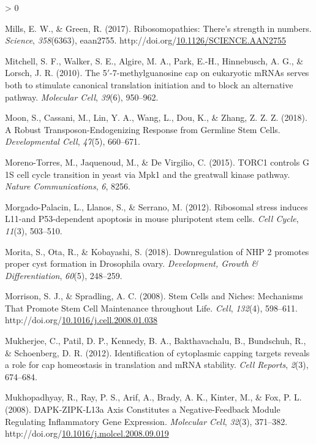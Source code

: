 \documentclass[12pt,oneside]{reedthesis}
\newlength{\cslhangindent}
\newenvironment{CSLReferences}[2] %
 {%
  \setlength{\parindent}{0pt}
  \ifodd #1 \everypar{\setlength{\hangindent}{\cslhangindent}}\ignorespaces\fi
  \ifnum #2 > 0
  \setlength{\parskip}{#2\baselineskip}
  \fi
 }%
 {}
\begin{document}
\begin{CSLReferences}{1}{0}
\leavevmode\hypertarget{ref-Mills2017c}{}%
Mills, E. W., \& Green, R. (2017). Ribosomopathies: {There}'s strength in numbers. \emph{Science}, \emph{358}(6363), eaan2755. http://doi.org/\href{https://doi.org/10.1126/SCIENCE.AAN2755}{10.1126/SCIENCE.AAN2755}

\leavevmode\hypertarget{ref-Mitchell2010}{}%
Mitchell, S. F., Walker, S. E., Algire, M. A., Park, E.-H., Hinnebusch, A. G., \& Lorsch, J. R. (2010). The 5{\({'}\)}-7-methylguanosine cap on eukaryotic {mRNAs} serves both to stimulate canonical translation initiation and to block an alternative pathway. \emph{Molecular Cell}, \emph{39}(6), 950--962.

\leavevmode\hypertarget{ref-Moon2018a}{}%
Moon, S., Cassani, M., Lin, Y. A., Wang, L., Dou, K., \& Zhang, Z. Z. Z. (2018). A {Robust Transposon-Endogenizing Response} from {Germline Stem Cells}. \emph{Developmental Cell}, \emph{47}(5), 660--671.

\leavevmode\hypertarget{ref-Moreno-Torres2015}{}%
Moreno-Torres, M., Jaquenoud, M., \& De Virgilio, C. (2015). {TORC1} controls {G} 1{{S}} cell cycle transition in yeast via {Mpk1} and the greatwall kinase pathway. \emph{Nature Communications}, \emph{6}, 8256.

\leavevmode\hypertarget{ref-Morgado-Palacin2012a}{}%
Morgado-Palacin, L., Llanos, S., \& Serrano, M. (2012). Ribosomal stress induces {L11-and} P53-dependent apoptosis in mouse pluripotent stem cells. \emph{Cell Cycle}, \emph{11}(3), 503--510.

\leavevmode\hypertarget{ref-Morita2018}{}%
Morita, S., Ota, R., \& Kobayashi, S. (2018). Downregulation of {NHP} 2 promotes proper cyst formation in {Drosophila} ovary. \emph{Development, Growth \& Differentiation}, \emph{60}(5), 248--259.

\leavevmode\hypertarget{ref-morrisonStemCellsNiches2008}{}%
Morrison, S. J., \& Spradling, A. C. (2008). Stem {Cells} and {Niches}: {Mechanisms That Promote Stem Cell Maintenance} throughout {Life}. \emph{Cell}, \emph{132}(4), 598--611. http://doi.org/\href{https://doi.org/10.1016/j.cell.2008.01.038}{10.1016/j.cell.2008.01.038}

\leavevmode\hypertarget{ref-Mukherjee2012}{}%
Mukherjee, C., Patil, D. P., Kennedy, B. A., Bakthavachalu, B., Bundschuh, R., \& Schoenberg, D. R. (2012). Identification of cytoplasmic capping targets reveals a role for cap homeostasis in translation and {mRNA} stability. \emph{Cell Reports}, \emph{2}(3), 674--684.

\leavevmode\hypertarget{ref-mukhopadhyayDAPKZIPKL13aAxisConstitutes2008}{}%
Mukhopadhyay, R., Ray, P. S., Arif, A., Brady, A. K., Kinter, M., \& Fox, P. L. (2008). {DAPK-ZIPK-L13a Axis Constitutes} a {Negative-Feedback Module Regulating Inflammatory Gene Expression}. \emph{Molecular Cell}, \emph{32}(3), 371--382. http://doi.org/\href{https://doi.org/10.1016/j.molcel.2008.09.019}{10.1016/j.molcel.2008.09.019}


\end{CSLReferences}
\end{document}
